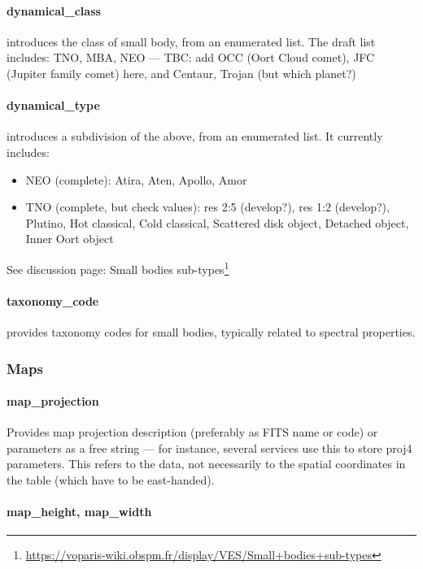 \documentclass[11pt,a4paper]{ivoa}
\begin{document}
\paragraph{dynamical\_class}

introduces the class of small body, from an enumerated list.
The draft list includes: TNO, MBA, NEO --- TBC: add OCC (Oort Cloud comet),
JFC (Jupiter family comet) here, and Centaur, Trojan (but which planet?)

\paragraph{dynamical\_type}

introduces a subdivision of the above, from an enumerated list.
It currently includes:

\begin{itemize}
\item NEO (complete): Atira, Aten, Apollo, Amor

\item TNO (complete, but check values):
res 2:5 (develop?), res 1:2 (develop?),
Plutino, Hot classical, Cold classical, Scattered disk object,
Detached object, Inner Oort object
\end{itemize}

See discussion page:
Small bodies sub-types\footnote{\url{https://voparis-wiki.obspm.fr/display/VES/Small+bodies+sub-types}}

\paragraph{taxonomy\_code}
provides taxonomy codes for small bodies, typically related to spectral properties.

\subsubsection{Maps}

\paragraph{map\_projection}

Provides map projection description (preferably as FITS name or code)
or parameters as a free string — for instance, several services use
this to store proj4 parameters. This refers to the data, not necessarily
to the spatial coordinates in the table (which have to be east-handed).

\paragraph{map\_height, map\_width}
\end{document}
